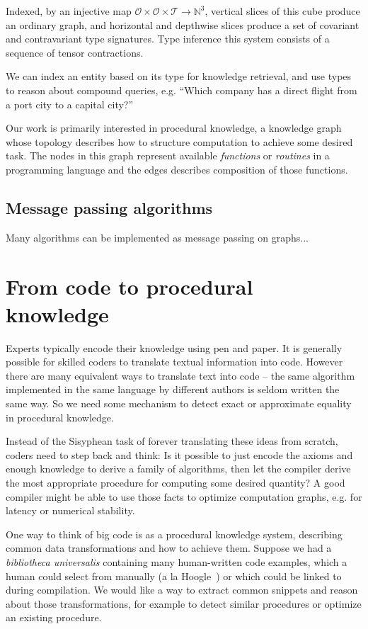 \documentclass[11pt]{article}
\begin{document}
    Indexed, by an injective map $\mathcal{O} \times \mathcal{O} \times \mathcal{T} → \mathbb{N}^3$, vertical slices of this cube produce an ordinary graph, and horizontal and depthwise slices produce a set of covariant and contravariant type signatures. Type inference this system consists of a sequence of tensor contractions.

    We can index an entity based on its type for knowledge retrieval, and use types to reason about compound queries, e.g. ``Which company has a direct flight from a port city to a capital city?''

    Our work is primarily interested in procedural knowledge, a knowledge graph whose topology describes how to structure computation to achieve some desired task. The nodes in this graph represent available \textit{functions} or \textit{routines} in a programming language and the edges describes composition of those functions.

    \subsection{Message passing algorithms}

    Many algorithms can be implemented as message passing on graphs...


    \pagebreak\section{From code to procedural knowledge}\label{sec:applications}

    Experts typically encode their knowledge using pen and paper. It is generally possible for skilled coders to translate textual information into code. However there are many equivalent ways to translate text into code -- the same algorithm implemented in the same language by different authors is seldom written the same way. So we need some mechanism to detect exact or approximate equality in procedural knowledge.

    Instead of the Sisyphean task of forever translating these ideas from scratch, coders need to step back and think: Is it possible to just encode the axioms and enough knowledge to derive a family of algorithms, then let the compiler derive the most appropriate procedure for computing some desired quantity? A good compiler might be able to use those facts to optimize computation graphs, e.g. for latency or numerical stability.

    One way to think of big code is as a procedural knowledge system, describing common data transformations and how to achieve them. Suppose we had a \textit{bibliotheca universalis} containing many human-written code examples, which a human could select from manually (a la Hoogle~\citep{james2020digging}) or which could be linked to during compilation. We would like a way to extract common snippets and reason about those transformations, for example to detect similar procedures or optimize an existing procedure.
\end{document}
